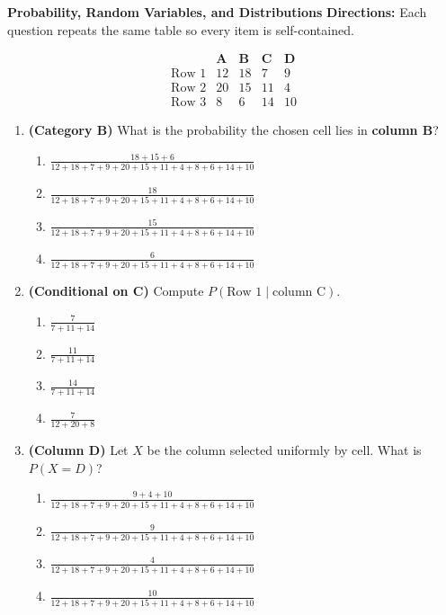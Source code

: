 
{\Large \textbf{Probability, Random Variables, and Distributions}}
\bigskip
\noindent\textbf{Directions:} Each question repeats the same table so every item is self-contained.

\[
\begin{array}{r|cccc}
 & \mathbf{A} & \mathbf{B} & \mathbf{C} & \mathbf{D} \\
 \text{Row 1} & 12 & 18 & 7 & 9 \\
 \text{Row 2} & 20 & 15 & 11 & 4 \\
 \text{Row 3} & 8  & 6  & 14 & 10
\end{array}
\]

\begin{enumerate}[label=\textbf{S\arabic*.}]

\item \textbf{(Category B)} What is the probability the chosen cell lies in \textbf{column B}? 
\begin{enumerate}[label=(\Alph*)]
\item $\displaystyle \frac{18+15+6}{12+18+7+9+20+15+11+4+8+6+14+10}$
\item $\displaystyle \frac{18}{12+18+7+9+20+15+11+4+8+6+14+10}$
\item $\displaystyle \frac{15}{12+18+7+9+20+15+11+4+8+6+14+10}$
\item $\displaystyle \frac{6}{12+18+7+9+20+15+11+4+8+6+14+10}$
\end{enumerate}

\item \textbf{(Conditional on C)} Compute $P(\text{Row 1}\mid \text{column C})$. 
\begin{enumerate}[label=(\Alph*)]
\item $\displaystyle \frac{7}{7+11+14}$
\item $\displaystyle \frac{11}{7+11+14}$
\item $\displaystyle \frac{14}{7+11+14}$
\item $\displaystyle \frac{7}{12+20+8}$
\end{enumerate}

\item \textbf{(Column D)} Let $X$ be the column selected uniformly by cell. What is $P(X=D)$? 
\begin{enumerate}[label=(\Alph*)]
\item $\displaystyle \frac{9+4+10}{12+18+7+9+20+15+11+4+8+6+14+10}$
\item $\displaystyle \frac{9}{12+18+7+9+20+15+11+4+8+6+14+10}$
\item $\displaystyle \frac{4}{12+18+7+9+20+15+11+4+8+6+14+10}$
\item $\displaystyle \frac{10}{12+18+7+9+20+15+11+4+8+6+14+10}$
\end{enumerate}


\end{enumerate}
